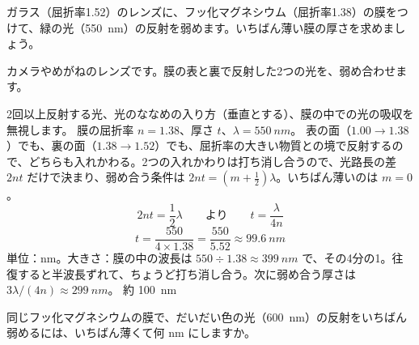 \begin{phreidai}[カメラのレンズの反射防止膜]
\label{ph:波-13:ex6}ガラス（屈折率1.52）のレンズに、フッ化マグネシウム（屈折率1.38）の膜をつけて、緑の光（\qty{550}{nm}）の反射を弱めます。いちばん薄い膜の厚さを求めましょう。
\phbamen
\noindent\begin{minipage}[c]{0.56\linewidth}\raggedright
カメラやめがねのレンズです。膜の表と裏で反射した2つの光を、弱め合わせます。
\end{minipage}\hfill
\begin{minipage}[c]{0.4\linewidth}\centering
{}
\end{minipage}
\phmushi
2回以上反射する光、光のななめの入り方（垂直とする）、膜の中での光の吸収を無視します。
\phzu
膜の屈折率 $n=1.38$、厚さ $t$、$\lambda=\qty{550}{nm}$。
\phriyu
表の面（$1.00\to1.38$）でも、裏の面（$1.38\to1.52$）でも、屈折率の大きい物質との境で反射するので、どちらも入れかわる。2つの入れかわりは打ち消し合うので、光路長の差 $2nt$ だけで決まり、弱め合う条件は $2nt=(m+\tfrac12)\lambda$。いちばん薄いのは $m=0$。
\phtateru
\[ 2nt=\frac12\lambda\qquad\text{より}\qquad t=\frac{\lambda}{4n} \]
\phtoku
\[ t=\frac{550}{4\times1.38}=\frac{550}{5.52}\approx\qty{99.6}{nm} \]
\phtashikame
単位：nm。大きさ：膜の中の波長は $550\div1.38\approx\qty{399}{nm}$ で、その4分の1。往復すると半波長ずれて、ちょうど打ち消し合う。次に弱め合う厚さは $3\lambda/(4n)\approx\qty{299}{nm}$。
\kotae 約 \qty{100}{nm}
\end{phreidai}
\begin{jibun}
同じフッ化マグネシウムの膜で、だいだい色の光（\qty{600}{nm}）の反射をいちばん弱めるには、いちばん薄くて何 nm にしますか。
\end{jibun}


